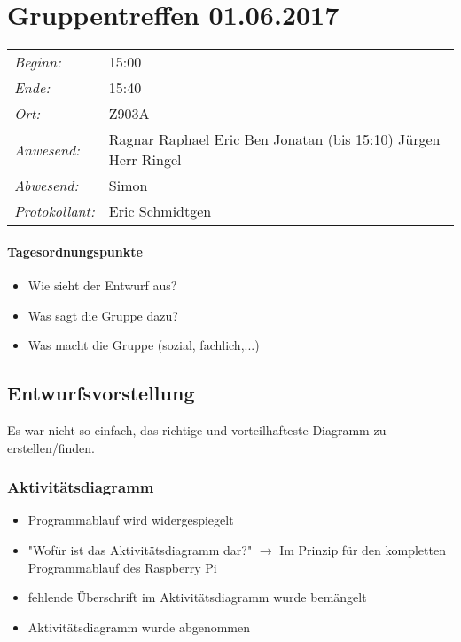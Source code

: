 \documentclass{scrartcl}
\date{01.06.2017}	%
\begin{document}
\maketitle
\section{Gruppentreffen 01.06.2017}	%
\begin{tabular}[t]{p{.25\linewidth} p{.25\linewidth}}
\emph{Beginn:}				& 15:00 \\
\emph{Ende:}					& 15:40 \\
\emph{Ort:}						& Z903A \\
\emph{Anwesend:}	& 
Ragnar\newline
Raphael\newline
Eric\newline
Ben\newline
Jonatan (bis 15:10)\newline
Jürgen\newline
Herr Ringel 
\\
\emph{Abwesend:}		 & 
Simon
\\
\emph{Protokollant:} & Eric Schmidtgen
\end{tabular}
\paragraph{Tagesordnungspunkte}
\begin{itemize}
\item Wie sieht der Entwurf aus?
\item Was sagt die Gruppe dazu?
\item Was macht die Gruppe (sozial, fachlich,...)
\end{itemize}


\subsection{Entwurfsvorstellung}
Es war nicht so einfach, das richtige und vorteilhafteste Diagramm zu erstellen/finden. 

\subsubsection{Aktivitätsdiagramm}
\begin{itemize}
	\item Programmablauf wird widergespiegelt
	\item "Wofür ist das Aktivitätsdiagramm dar?" $\rightarrow$ Im Prinzip für den kompletten Programmablauf des Raspberry Pi
	\item fehlende Überschrift im Aktivitätsdiagramm wurde bemängelt
	\item Aktivitätsdiagramm wurde abgenommen
\end{itemize}
\end{document}
